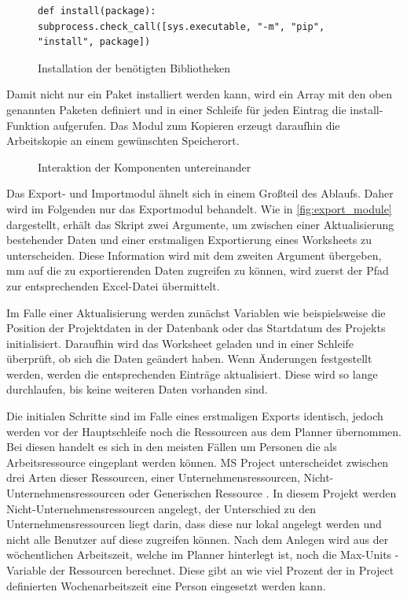 \documentclass[11pt,a4paper]{report}
\begin{document}
\begin{figure}[H]
    \centering
    \begin{verbatim}
def install(package):
subprocess.check_call([sys.executable, "-m", "pip", "install", package])
    \end{verbatim}
    \caption{Installation der benötigten Bibliotheken}
    \label{fig:install_package}
\end{figure}

\noindent
Damit nicht nur ein Paket installiert werden kann, wird ein Array mit den oben genannten Paketen definiert und in einer Schleife für jeden Eintrag die install-Funktion aufgerufen. Das Modul zum Kopieren erzeugt daraufhin die Arbeitskopie an einem gewünschten Speicherort.
\begin{figure}[H]
    \centerline{}
    \caption{Interaktion der Komponenten untereinander}
    \label{fig:komponenten}
\end{figure}

\noindent
Das Export- und Importmodul ähnelt sich in einem Großteil des Ablaufs. Daher wird im Folgenden nur das Exportmodul behandelt. Wie in \ref{fig:export_module} dargestellt, erhält das Skript zwei Argumente, um zwischen einer Aktualisierung bestehender Daten und einer erstmaligen Exportierung eines Worksheets zu unterscheiden. Diese Information wird mit dem zweiten Argument übergeben, mm auf die zu exportierenden Daten zugreifen zu können, wird zuerst der Pfad zur entsprechenden Excel-Datei übermittelt.

\noindent
Im Falle einer Aktualisierung werden zunächst Variablen wie beispielsweise die Position der Projektdaten in der Datenbank oder das Startdatum des Projekts initialisiert. Daraufhin wird das Worksheet geladen und in einer Schleife überprüft, ob sich die Daten geändert haben. Wenn Änderungen festgestellt werden, werden die entsprechenden Einträge aktualisiert. Diese wird so lange durchlaufen, bis keine weiteren Daten vorhanden sind.

\noindent
Die initialen Schritte sind im Falle eines erstmaligen Exports identisch, jedoch werden vor der Hauptschleife noch die Ressourcen aus dem Planner übernommen. Bei diesen handelt es sich in den meisten Fällen um Personen die als Arbeitsressource eingeplant werden können. MS Project unterscheidet zwischen drei Arten dieser Ressourcen, einer Unternehmensressourcen, Nicht-Unternehmensressourcen oder Generischen Ressource \cite{project_ressource}. In diesem Projekt werden Nicht-Unternehmensressourcen angelegt, der Unterschied zu den Unternehmensressourcen liegt darin, dass diese nur lokal angelegt werden und nicht alle Benutzer auf diese zugreifen können. Nach dem Anlegen wird aus der wöchentlichen Arbeitszeit, welche im Planner hinterlegt ist, noch die \glqq Max-Units \grqq{}-Variable der Ressourcen berechnet. Diese gibt an wie viel Prozent der in Project definierten Wochenarbeitszeit eine Person eingesetzt werden kann.
\end{document}
